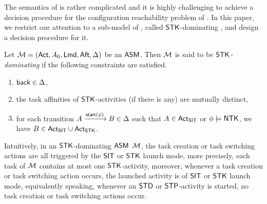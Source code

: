 The semantics of {\AMASS} %
is rather complicated and it is highly challenging to achieve a decision procedure for the configuration reachability problem of {\AMASS}. 
%
In this paper, we restrict our attention to a sub-model of {\AMASS}, called $\mathsf{STK}$-dominating {\AMASS}, and design a decision procedure for it. 
	
	
	\begin{definition} \label{def:stk-amass}
		Let ${\mathcal{M} } = ({\sf Act}, A_0, {\sf Lmd}, {\sf Aft}, \Delta)$ be an $\textsf{ASM}$. Then ${\mathcal{M} }$ is  said to be \emph{$\mathsf{STK}$-dominating} if the following constraints are satisfied.
		\begin{enumerate}
			\item ${\mathsf{back} }\in\Delta$,
			\item the task affinities of ${\sf STK}$-activities (if there is any) are mutually distinct,
			\item for each transition $A \xrightarrow{{\mathsf{start} }(\phi)} B\in\Delta$ such that $A \in {\sf Act}_{\sf SIT}$ or $\phi\models {\sf NTK}$, we have $B \in {\sf Act}_{{\sf SIT}} \cup {\sf Act}_{{\sf STK}}$.
		\end{enumerate}
	\end{definition}
	Intuitively, in an $\mathsf{STK}$-dominating $\textsf{ASM}$ ${\mathcal{M} }$, the task creation or task switching actions are all triggered by the ${\sf SIT}$ or ${\sf STK}$ launch mode, more precisely,  
	each task of ${\mathcal{M} }$ contains at most one $\mathsf{STK}$-activity, moreover, whenever a task creation or task switching action occurs, the launched activity is of ${\sf SIT}$ or ${\sf STK}$ launch mode, equivalently speaking, 
	whenever an ${\sf STD}$ or ${\sf STP}$-activity is started, no task creation or task switching actions occur.  %
	
